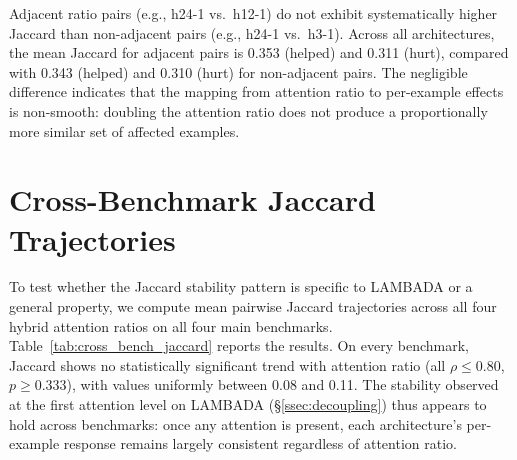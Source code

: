 Adjacent ratio pairs (e.g., h24-1 vs.\ h12-1) do not exhibit systematically higher Jaccard than non-adjacent pairs (e.g., h24-1 vs.\ h3-1). Across all architectures, the mean Jaccard for adjacent pairs is 0.353 (helped) and 0.311 (hurt), compared with 0.343 (helped) and 0.310 (hurt) for non-adjacent pairs. The negligible difference indicates that the mapping from attention ratio to per-example effects is non-smooth: doubling the attention ratio does not produce a proportionally more similar set of affected examples.

\section{Cross-Benchmark Jaccard Trajectories}\label{app:cross_bench_jaccard}

To test whether the Jaccard stability pattern is specific to LAMBADA or a general property, we compute mean pairwise Jaccard trajectories across all four hybrid attention ratios on all four main benchmarks. Table~\ref{tab:cross_bench_jaccard} reports the results. On every benchmark, Jaccard shows no statistically significant trend with attention ratio (all $\rho \leq 0.80$, $p \geq 0.333$), with values uniformly between 0.08 and 0.11. The stability observed at the first attention level on LAMBADA (\S\ref{ssec:decoupling}) thus appears to hold across benchmarks: once any attention is present, each architecture's per-example response remains largely consistent regardless of attention ratio.

\begin{table}[ht]
\centering
\small
\caption{Mean pairwise Jaccard (mean of helped and hurt sets, 3 architecture pairs) across attention ratios and benchmarks (1.3B scale). $\rho$: Spearman correlation between attention ratio and $\bar{J}$. All $p \geq 0.333$.}
\label{tab:cross_bench_jaccard}
\end{table}


